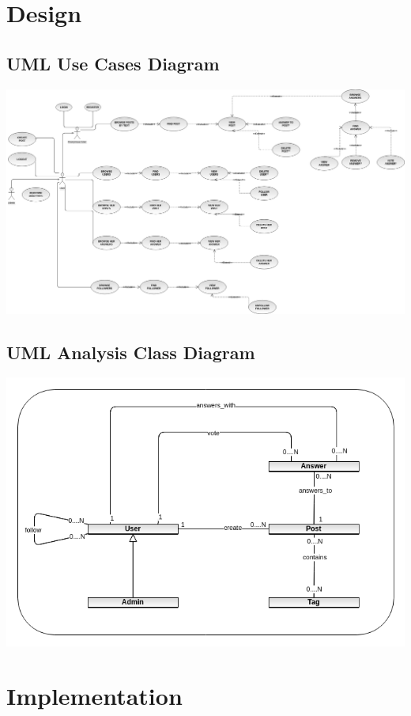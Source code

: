 \documentclass[11pt]{report}
\begin{document}
\chapter{Design} \label{design}
\section{UML Use Cases Diagram}
    \includegraphics[width=\textwidth,keepaspectratio=true]{img/use_cases.png}\par

\newpage

\section{UML Analysis Class Diagram}
    \includegraphics[width=\textwidth,keepaspectratio=true]{img/class-diagram.png}\par
\newpage


\chapter{Implementation}\label{implementation}
\end{document}

